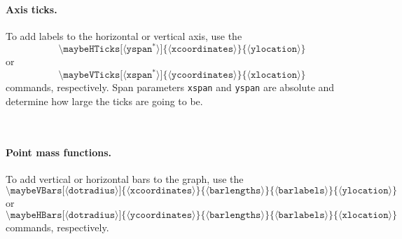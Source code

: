 \documentclass{article}
\newcommand{\command}[1]{\texttt{\textbackslash #1}}
\newcommand{\param}[1]{$\langle${#1}$\rangle$}
\newcommand{\Absolute}{${}^*$}
\begin{document}
\paragraph*{Axis ticks.}
To add labels to the horizontal or vertical axis, use the
\[
    \command{maybeHTicks[\param{yspan\Absolute}]\{\param{xcoordinates}\}\{\param{ylocation}\}}
\]
or
\[
    \command{maybeVTicks[\param{xspan\Absolute}]\{\param{ycoordinates}\}\{\param{xlocation}\}}
\]
commands, respectively.
Span parameters \texttt{xspan} and \texttt{yspan} are absolute and determine how large the ticks are going to be.
\begin{center}
    \\
\end{center}

\paragraph*{Point mass functions.}
To add vertical or horizontal bars to the graph, use the
\[
    \command{maybeVBars[\param{dotradius}]\{\param{xcoordinates}\}\{\param{barlengths}\}\{\param{barlabels}\}\{\param{ylocation}\}}
\]
or
\[
    \command{maybeHBars[\param{dotradius}]\{\param{ycoordinates}\}\{\param{barlengths}\}\{\param{barlabels}\}\{\param{xlocation}\}}
\]
commands, respectively.
\begin{center}
    \\
\end{center}
\end{document}
